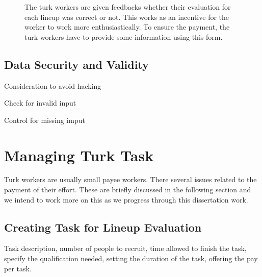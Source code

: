 \documentclass[11pt]{article}
\begin{document}
\begin{figure}[hbtp]
   \centering
       \caption{The turk workers are given feedbacks whether their evaluation for each lineup was correct or not. This works as an incentive for the worker to work more enthusiastically. To ensure the payment, the turk workers have to provide some information using this form.}
       \label{fig:turk_web_feedback}
\end{figure}

\subsection{Data Security and Validity} Consideration to avoid hacking

Check for invalid input

Control for missing imput

\section{Managing Turk Task} Turk workers are usually small payee workers. There several issues related to the payment of their effort. These are briefly discussed in the following section and we intend to work more on this as we progress through this dissertation work. 

\subsection{Creating Task for Lineup Evaluation} Task description, number of people to recruit, time allowed to finish the task, specify the qualification needed, setting the duration of the task, offering the pay per task.
\end{document}
